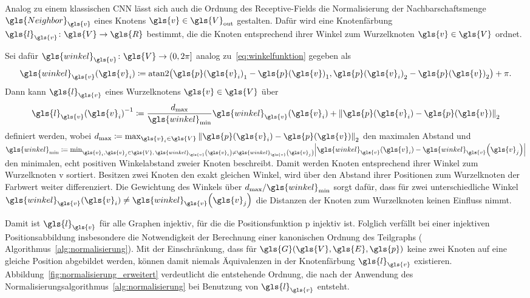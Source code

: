 Analog zu einem klassischen \gls{CNN} lässt sich auch die Ordnung des Receptive-Fields \bzw{} die Normalisierung der Nachbarschaftsmenge $\gls{Neighbor}_{\gls{v}}$ eines Knotens $\gls{v} \in \gls{V}_{\mathrm{out}}$ gestalten.
Dafür wird eine Knotenfärbung $\gls{l}_{\gls{v}} \colon \gls{V} \to \gls{R}$ bestimmt, die die Knoten entsprechend ihrer Winkel zum Wurzelknoten $\gls{v} \in \gls{V}$ ordnet.

Sei dafür $\gls{winkel}_{\gls{v}} \colon \gls{V} \to \left(0, 2\pi\right]$ analog zu~\eqref{eq:winkelfunktion} gegeben als
\begin{equation*}
  \gls{winkel}_{\gls{v}}\left(\gls{v}_i\right) \coloneqq \mathrm{atan2}\left({\gls{p}\left(\gls{v}_i\right)}_1 - {\gls{p}\left(\gls{v}\right)}_1, {\gls{p}\left(\gls{v}_i\right)}_2 - {\gls{p}\left(\gls{v}\right)}_2\right) + \pi.
\end{equation*}
Dann kann $\gls{l}_{\gls{v}}$ \bzgl{} eines Wurzelknotens $\gls{v} \in \gls{V}$ über
\begin{equation*}
  {\gls{l}_{\gls{v}}\left(\gls{v}_i\right)}^{-1} \coloneqq \frac{d_{\max}}{\gls{winkel}_{\min}} \gls{winkel}_{\gls{v}}\left(\gls{v}_i\right) + {\left\|\gls{p}\left(\gls{v}_i\right) - \gls{p}\left(\gls{v}\right)\right\|}_2
\end{equation*}
definiert werden, wobei $d_{\max} \coloneqq \max_{\gls{v}_i \in \gls{V}} {\left\| \gls{p}\left(\gls{v}_i\right) - \gls{p}\left(\gls{v}\right) \right\|}_2$ den maximalen Abstand und $\gls{winkel}_{\min} \coloneqq \min_{\gls{v}_i, \gls{v}_j \in \gls{V},\, \gls{winkel}_{\gls{v}}\left(\gls{v}_i\right) \neq \gls{winkel}_{\gls{v}}\left(\gls{v}_j \right)} \left|\gls{winkel}_{\gls{v}}\left(\gls{v}_i\right) - \gls{winkel}_{\gls{v}}\left(\gls{v}_j\right)\right|$ den minimalen, echt positiven Winkelabstand zweier Knoten beschreibt.
Damit werden Knoten entsprechend ihrer Winkel zum Wurzelknoten \gls{v} sortiert.
Besitzen zwei Knoten den exakt gleichen Winkel, wird über den Abstand ihrer Positionen zum Wurzelknoten der Farbwert weiter differenziert.
Die Gewichtung des Winkels über $d_{\max}/\gls{winkel}_{\min}$ sorgt dafür, dass für zwei unterschiedliche Winkel $\gls{winkel}_{\gls{v}}\left(\gls{v}_i\right) \neq \gls{winkel}_{\gls{v}}\left(\gls{v}_j\right)$ die Distanzen der Knoten zum Wurzelknoten keinen Einfluss nimmt.

Damit ist $\gls{l}_{\gls{v}}$ für alle Graphen injektiv, für die die Positionsfunktion \gls{p} injektiv ist.
Folglich verfällt bei einer injektiven Positionsabbildung insbesondere die Notwendigkeit der Berechnung einer kanonischen Ordnung des Teilgraphs (\vgl{} Algorithmus~\ref{alg:normalisierung}).
Mit der Einschränkung, dass für $\gls{G}\left(\gls{V}, \gls{E}, \gls{p}\right)$ keine zwei Knoten auf eine gleiche Position abgebildet werden, können damit niemals Äquivalenzen in der Knotenfärbung $\gls{l}_{\gls{v}}$ existieren.
Abbildung~\ref{fig:normalisierung_erweitert} verdeutlicht die entstehende Ordnung, die nach der Anwendung des Normalisierungsalgorithmus~\ref{alg:normalisierung} bei Benutzung von $\gls{l}_{\gls{v}}$ entsteht.

